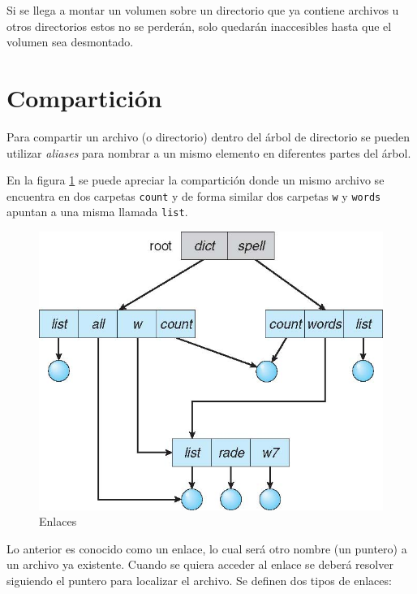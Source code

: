 Si se llega a montar un volumen sobre un directorio que ya contiene archivos u
otros directorios estos no se perderán, solo quedarán inaccesibles hasta que el
volumen sea desmontado.

\section{Compartición}
Para compartir un archivo (o directorio) dentro del árbol de directorio se
pueden utilizar \textit{aliases} para nombrar a un mismo elemento en diferentes
partes del árbol.

En la figura \ref{fig:archivos_enlaces} se puede apreciar la compartición donde
un mismo archivo se encuentra en dos carpetas \texttt{count} y de forma similar
dos carpetas \texttt{w} y \texttt{words} apuntan a una misma llamada
\texttt{list}.

\begin{figure}[htbp]
\centering
\includegraphics[scale=1]{img/C08_disco/enlaces.jpg}
\caption{Enlaces}
\label{fig:archivos_enlaces}
\end{figure}

Lo anterior es conocido como un enlace, lo cual será otro nombre (un puntero) a un archivo ya existente. Cuando se quiera acceder al enlace se deberá resolver siguiendo el puntero para localizar el archivo. Se definen dos tipos de enlaces:

